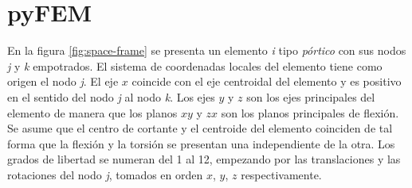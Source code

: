 \chapter{pyFEM}
\label{cha:pyFEM}

En la figura \ref{fig:space-frame} se presenta un elemento \emph{i} tipo \emph{pórtico} con sus nodos \emph{j} y \emph{k} empotrados. El sistema de coordenadas locales del elemento tiene como origen el nodo \emph{j}. El eje $ x $ coincide con el eje centroidal del elemento y es positivo en el sentido del nodo \emph{j} al nodo \emph{k}. Los ejes $ y $ y $ z $ son los ejes principales del elemento de manera que los planos $ xy $ y $ zx $ son los planos principales de flexión. Se asume que el centro de cortante y el centroide del elemento coinciden de tal forma que la flexión y la torsión se presentan una independiente de la otra. Los grados de libertad se numeran del 1 al 12, empezando por las translaciones y las rotaciones del nodo \emph{j}, tomados en orden $ x $, $ y $, $ z $ respectivamente.


